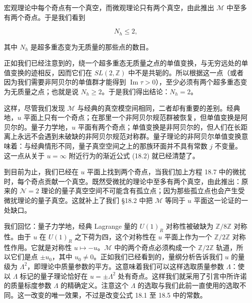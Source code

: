 
宏观理论中每个奇点有一个真空，而微观理论只有两个真空，由此推出 $\mathcal{M}$ 中至多有两个奇点。于是我们看到

\[
  N_h\le2,
\]

其中 $N_h$ 是超多重态变为无质量的那些点的数目。

正如我们已经注意到的，绕一个超多重态无质量之点的单值变换，与无穷远处的单值变换的迹相反，因而它们在 $SL(2,\mathbb{Z})$ 中不是共轭的。所以根据这一点（或者因为我们需要非阿贝尔的单值群才能得到 $\operatorname{Im}\tau>0$），至少必须有两个超多重态变为无质量之点；也就是说 $N_h\ge2$。于是我们得出结论：$N_h=2$。

这样，尽管我们发现 $\mathcal{M}$ 与经典的真空模空间相同，二者却有重要的差别。经典地，$u$ 平面上只有一个奇点；在那里一个非阿贝尔规范群被恢复，但单值变换是阿贝尔的。量子力学地，$u$ 平面有两个奇点；单值变换是非阿贝尔的，但人们在长距离上永远不会遇到未破缺的非阿贝尔规范对称群。量子理论的非阿贝尔单值变换意味着：与经典情形不同，量子真空空间之上的那族环面并不具有常数 $j$ 不变量。这一点从关于 $u=\infty$ 附近行为的渐近公式 (18.2) 就已经清楚了。

到目前为止，我们已经在 $u$ 平面上找到两个奇点，当我们加上方程 18.7 中的微扰时，每个奇点贡献一个真空。既然受微扰的理论中至多有两个真空，由此推出：原来的 $\mathcal{N}=2$ 理论的量子真空空间不可能含有孤立点；因为那些孤立点也会产生受微扰理论的量子真空。这就补上了我们 §18.2 中把 $\mathcal{M}$ 等同于 $u$ 平面这一论证的一处缺口。

我们回忆：量子力学地，经典 Lagrange 量的 $U(1)_R$ 对称性被破缺为 $\mathbb{Z}/8\mathbb{Z}$ 对称性。由于 $u$ 在 $U(1)_R$ 之下荷为四，这个对称性在 $u$ 平面上作为一个 $\mathbb{Z}/2\mathbb{Z}$ 对称性作用。它就是对称性 $u\mapsto-u$。$\mathcal{M}$ 中的两个奇点必须构成一个 $\mathbb{Z}/2\mathbb{Z}$ 轨道，所以它们是点 $\pm u_0$，其中 $u_0\neq0$。正如我们已经看到的，量纲分析告诉我们 $u$ 的量级为 $\Lambda^2$，即理论中质量参数的平方。这意味着我们可以这样选取质量参数 $\Lambda$：使以 $\Lambda$ 标记的量子理论恰好在 $u=\pm\Lambda^2$ 处有奇点。这样我们就采用了引言中所许诺的质量标度参数 $\Lambda$ 的精确定义。注意这个 $\Lambda$ 的选取与我们此前一直使用的选取不同。这一改变的唯一效果，不过是改变公式 18.1 至 18.5 中的常数。

